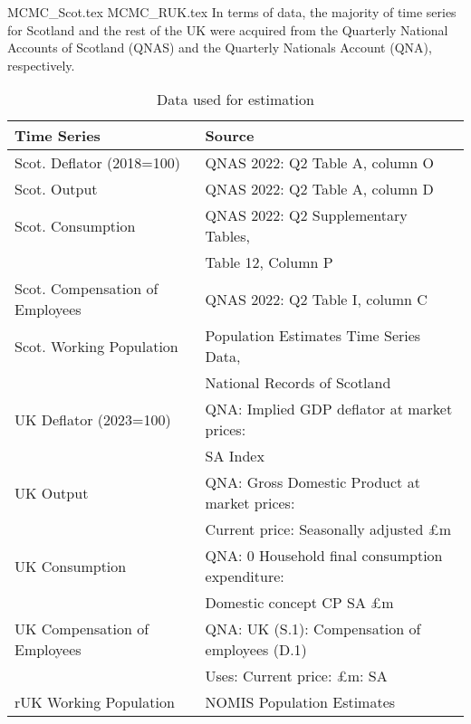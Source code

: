 {MCMC_Scot.tex}
{MCMC_RUK.tex}
In terms of data, the majority of time series for Scotland and the rest of the UK were acquired from the Quarterly National Accounts of Scotland (QNAS) and the Quarterly Nationals Account (QNA), respectively.
\begin{table}[htbp]
    \begin{tabular}{ll}
    \textbf{Time Series} & \textbf{Source}  \\ \hline
    Scot. Deflator (2018=100)         & QNAS 2022: Q2 Table A, column O                                                       \\ 
    Scot. Output                      & QNAS 2022: Q2 Table A, column D                                                       \\
    Scot. Consumption                 & QNAS 2022: Q2 Supplementary Tables, \\& Table 12, Column P                                \\
    Scot. Compensation of Employees & QNAS 2022: Q2 Table I, column C                                                       \\
    Scot. Working Population                & Population Estimates Time Series Data, \\ & National Records of Scotland                   \\
    UK Deflator (2023=100)          & QNA: Implied GDP deflator at market prices: \\ &SA Index                                  \\
    UK Output                       & QNA: Gross Domestic Product at market prices:\\ & Current price: Seasonally adjusted £m   \\
    UK Consumption                  & QNA: 0 Household final consumption expenditure:\\ &Domestic concept CP SA £m             \\
    UK Compensation of Employees  & QNA: UK (S.1): Compensation of employees (D.1) \\ & Uses: Current price: £m: SA            \\
    rUK Working Population                & NOMIS Population Estimates                                                            \\ 
    \end{tabular}
    \caption{Data used for estimation}
    \label{table:data_for_estimation}
\end{table} 
